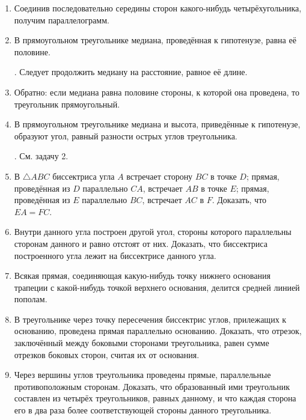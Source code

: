\documentclass[oneside]{book}
\begin{document}
\begin{enumerate}

 \item
Соединив последовательно середины сторон какого-нибудь четырёхугольника, получим параллелограмм.

 \item
В прямоугольном треугольнике медиана, проведённая к гипотенузе, равна её половине.

\smallskip
{}.
Следует продолжить медиану на расстояние, равное её длине.

 \item
Обратно:
если медиана равна половине стороны, к которой она проведена, то треугольник прямоугольный.

 \item
В прямоугольном треугольнике медиана и высота, приведённые к гипотенузе, образуют угол, равный разности острых углов треугольника.

\smallskip
{}.
См.
задачу 2.

 \item
В $\triangle ABC$ биссектриса угла $A$ встречает сторону $BC$ в точке $D$;
прямая, проведённая из $D$ параллельно $CA$, встречает $AB$ в точке $E$;
прямая, проведённая из $E$ параллельно $BC$, встречает $AC$ в $F$.
Доказать, что $EA=FC$.

 \item
Внутри данного угла построен другой угол, стороны которого параллельны сторонам данного и равно отстоят от них.
Доказать, что биссектриса построенного угла лежит на биссектрисе данного угла.

 \item
Всякая прямая, соединяющая какую-нибудь точку нижнего основания трапеции с какой-нибудь точкой верхнего основания, делится средней линией пополам.

 \item
В треугольнике через точку пересечения биссектрис углов, прилежащих к основанию, проведена прямая параллельно основанию.
Доказать, что отрезок, заключённый между боковыми сторонами треугольника, равен сумме отрезков боковых сторон, считая их от основания.

 \item
Через вершины углов треугольника проведены прямые, параллельные противоположным сторонам.
Доказать, что образованный ими треугольник составлен из четырёх треугольников, равных данному, и что каждая сторона его в два раза более соответствующей стороны данного треугольника.


\end{enumerate}
\end{document}
